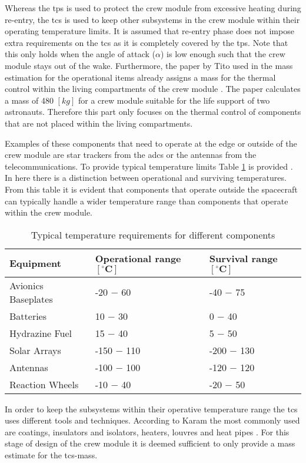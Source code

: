 Whereas the \acrfull{tps} is used to protect the crew module from excessive heating during re-entry, the \acrfull{tcs} is used to keep other subsystems in the crew module within their operating temperature limits. It is assumed that re-entry phase does not impose extra requirements on the \gls{tcs} as it is completely covered by the \gls{tps}. Note that this only holds when the angle of attack ($\alpha$) is low enough such that the crew module stays out of the wake. Furthermore, the paper by Tito used in the mass estimation for the operational items already assigns a mass for the thermal control within the living compartments of the crew module \cite{Tito2013}. The paper calculates a mass of 480 $[kg]$ for a crew module suitable for the life support of two astronauts. Therefore this part only focuses on the thermal control of components that are not placed within the living compartments.

Examples of these components that need to operate at the edge or outside of the crew module are star trackers from the \gls{adcs} or the antennas from the telecommunications. To provide typical temperature limits Table \ref{tab:cmtherm} is provided \cite[p.686]{Wertz2011}. In here there is a distinction between operational and surviving temperatures. From this table it is evident that components that operate outside the spacecraft can typically handle a wider temperature range than components that operate within the crew module.

\begin{table}[h]
	\centering
	\caption{Typical temperature requirements for different components}
	\begin{tabular}{|l||l|l|}
		\hline
		\textbf{Equipment} & \textbf{Operational range $\mathbf{[^{\circ}C]}$} & \textbf{Survival range $\mathbf{[^{\circ}C]}$}\\ \hline \hline
		Avionics Baseplates & -20 $-$ 60 & -40 $-$ 75 \\
		Batteries & 10 $-$ 30 & 0 $-$ 40 \\
		Hydrazine Fuel & 15 $-$ 40 & 5 $-$ 50 \\
		Solar Arrays & -150 $-$ 110 & -200 $-$ 130 \\
		Antennas & -100 $-$ 100 & -120 $-$ 120 \\
		Reaction Wheels & -10 $-$ 40 & -20 $-$ 50 \\
		\hline
	\end{tabular}
	\label{tab:cmtherm}
\end{table}

In order to keep the subsystems within their operative temperature range the \gls{tcs} uses different tools and techniques. According to Karam the most commonly used are coatings, insulators and isolators, heaters, louvres and heat pipes \cite{Karam1998}. For this stage of design of the crew module it is deemed sufficient to only provide a mass estimate for the \gls{tcs}-mass.

